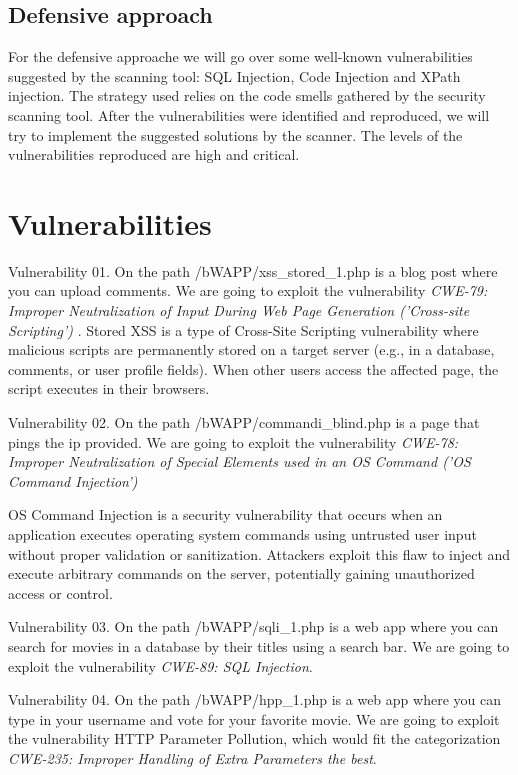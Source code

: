 \documentclass{article}
\begin{document}
\subsection{Defensive approach}
\par For the defensive approache we will go over some well-known vulnerabilities suggested by the scanning tool: SQL Injection, Code Injection and XPath injection. The strategy used relies on the code smells gathered by the security scanning tool. After the vulnerabilities were identified and reproduced, we will try to implement the suggested solutions by the scanner. The levels of the vulnerabilities reproduced are high and critical.

\section{Vulnerabilities}
\label{}
\par Vulnerability 01. On the path /bWAPP/xss\_stored\_1.php is a blog post where you can upload comments.
We are going to exploit the vulnerability \textit{CWE-79: Improper Neutralization of Input During Web Page Generation ('Cross-site Scripting')} \cite{vul:xss}.
Stored XSS is a type of Cross-Site Scripting vulnerability where malicious scripts are permanently stored on a target server (e.g., in a database, comments, or user profile fields). When other users access the affected page, the script executes in their browsers.

\par Vulnerability 02. On the path /bWAPP/commandi\_blind.php is a page that pings the ip provided.
We are going to exploit the vulnerability \textit{CWE-78: Improper Neutralization of Special Elements used in an OS Command ('OS Command Injection')} \cite{vul:command-injection}

OS Command Injection is a security vulnerability that occurs when an application executes operating system commands using untrusted user input without proper validation or sanitization. Attackers exploit this flaw to inject and execute arbitrary commands on the server, potentially gaining unauthorized access or control.


\par Vulnerability 03. On the path /bWAPP/sqli\_1.php is a web app where you can search for movies in a database by their titles using a search bar. We are going to exploit the vulnerability \textit{CWE-89: SQL Injection}. \cite{Vuln001}
\par Vulnerability 04. On the path /bWAPP/hpp\_1.php is a web app where you can type in your username and vote for your favorite movie. We are going to exploit the vulnerability HTTP Parameter Pollution, which would fit the categorization \textit{CWE-235: Improper Handling of Extra Parameters the best}. \cite{vul:httppp}
\end{document}

